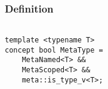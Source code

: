 
\subsubsection{Definition}

\begin{verbatim}

template <typename T>
concept bool MetaType =
	MetaNamed<T> &&
	MetaScoped<T> &&
	meta::is_type_v<T>;

\end{verbatim}
